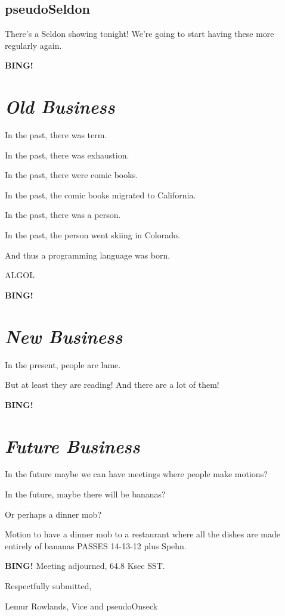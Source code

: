 \documentclass[10pt]{article}
\newcommand{\bing}{{\bf BING!} }
\newcommand{\goto}[1]{\bing \vskip 12pt \section*{{\em{#1}}}}
\newcommand{\ps}{ plus Spehn\xspace}
\newcommand{\onseck}{Lemur Rowlands, Vice and pseudoOnseck}
\begin{document}
\subsection*{pseudoSeldon}

There's a Seldon showing tonight!  We're going to start having these
more regularly again.

\goto{Old Business}

In the past, there was term.

In the past, there was exhaustion.

In the past, there were comic books.

In the past, the comic books migrated to California.

In the past, there was a person.

In the past, the person went skiing in Colorado.

And thus a programming language was born.

ALGOL


\goto{New Business}

In the present, people are lame.

But at least they are reading!  And there are a lot of them!


\goto{Future Business}

In the future maybe we can have meetings where people make motions?

In the future, maybe there will be bananas?

Or perhaps a dinner mob?

Motion to have a dinner mob to a restaurant where all the dishes
are made entirely of bananas PASSES 14-13-12\ps.


\bing
\noindent
Meeting adjourned, 64.8 Ksec SST.

\vspace{18pt}

\centerline{Respectfully submitted,}
\centerline{\onseck}
\end{document}
